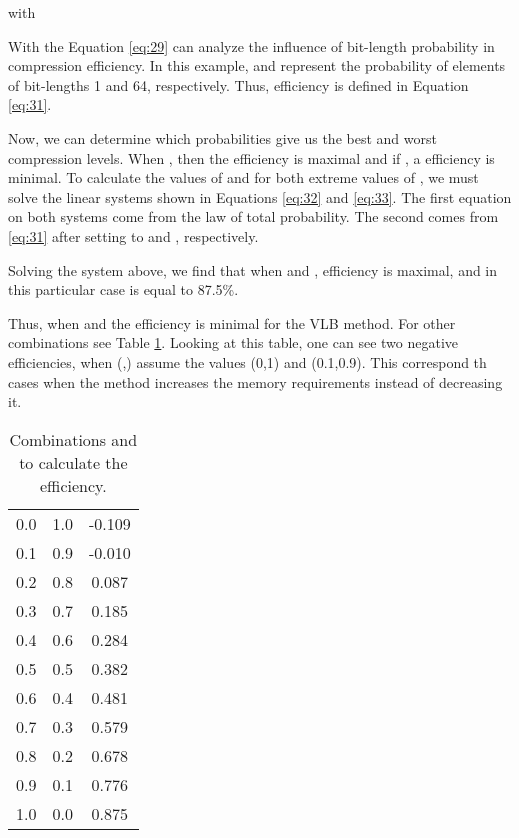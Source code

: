 \documentclass[10pt]{article}
\begin{document}
\noindent with



With the Equation \ref{eq:29} can analyze the influence of bit-length probability in compression efficiency. In this example,  and  represent the probability of elements of bit-lengths 1 and 64, respectively. Thus, efficiency is defined in Equation \ref{eq:31}.



Now, we can determine which probabilities give us the best and worst compression levels. When , then the efficiency is maximal and if , a efficiency is minimal. To calculate the values ​​of  and  for both extreme values of ,  we must solve the linear systems shown in Equations \ref{eq:32} and \ref{eq:33}. The first equation on both systems come from the law of total probability. The second comes from \ref{eq:31} after setting  to  and , respectively.



Solving the system above, we find that  when  and , efficiency is maximal, and in this particular case is equal to 87.5\%. 



Thus, when  and  the efficiency is minimal for the VLB method. For other combinations see Table \ref{tab:02}. Looking at this table, one can see two negative efficiencies, when (,) assume the values ​​(0,1) and (0.1,0.9). This correspond th cases when the method increases the memory requirements instead of decreasing it.

\begin{table}[h]
 \centering
 \caption{Combinations  and  to calculate the efficiency.}
 \begin{tabular}{ccc}
  \hline 
    &  &  \\
  \hline
  0.0	&1.0    &-0.109 \\
  0.1	&0.9	&-0.010 \\
  0.2	&0.8	&0.087 \\
  0.3	&0.7	&0.185 \\
  0.4	&0.6	&0.284 \\
  0.5	&0.5	&0.382 \\
  0.6	&0.4	&0.481 \\
  0.7	&0.3	&0.579 \\ 
  0.8	&0.2	&0.678 \\
  0.9	&0.1	&0.776 \\ 
  1.0	&0.0	&0.875 \\
  \hline
 \end{tabular}
 \label{tab:02}
\end{table}
\end{document}
